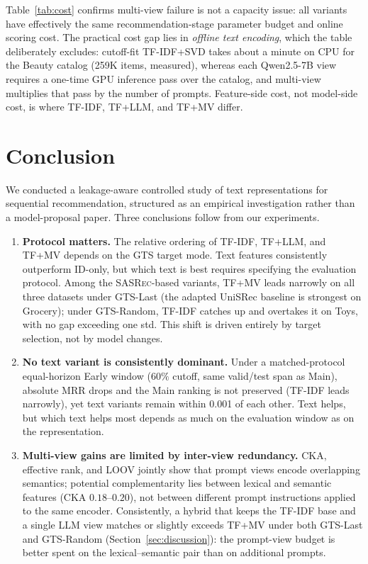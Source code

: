\documentclass[sigconf,natbib=true,anonymous]{acmart}
\newcommand{\tfidf}{\textsc{TF-IDF}\xspace}
\newcommand{\tfllm}{\textsc{TF+LLM}\xspace}
\newcommand{\tfmv}{\textsc{TF+MV}\xspace}
\newcommand{\base}{\textsc{SASRec}\xspace}
\begin{document}
Table~\ref{tab:cost} confirms multi-view failure is not a capacity issue: all variants have effectively the same recommendation-stage parameter budget and online scoring cost.
The practical cost gap lies in \emph{offline text encoding}, which the table deliberately excludes: cutoff-fit \tfidf+SVD takes about a minute on CPU for the Beauty catalog (259K items, measured), whereas each Qwen2.5-7B view requires a one-time GPU inference pass over the catalog, and multi-view multiplies that pass by the number of prompts.
Feature-side cost, not model-side cost, is where \tfidf, \tfllm, and \tfmv differ.

\section{Conclusion}
\label{sec:conclusion}

We conducted a leakage-aware controlled study of text representations for sequential recommendation, structured as an empirical investigation rather than a model-proposal paper.
Three conclusions follow from our experiments.

\begin{enumerate}[leftmargin=*,itemsep=1pt]
\item \textbf{Protocol matters.}
The relative ordering of \tfidf, \tfllm, and \tfmv depends on the GTS target mode.
Text features consistently outperform ID-only, but which text is best requires specifying the evaluation protocol.
Among the \base-based variants, \tfmv leads narrowly on all three datasets under GTS-Last (the adapted UniSRec baseline is strongest on Grocery); under GTS-Random, \tfidf catches up and overtakes it on Toys, with no gap exceeding one std. This shift is driven entirely by target selection, not by model changes.
\item \textbf{No text variant is consistently dominant.}
Under a matched-protocol equal-horizon Early window ($60\%$ cutoff, same valid/test span as Main), absolute MRR drops and the Main ranking is not preserved (\tfidf leads narrowly), yet text variants remain within 0.001 of each other.
Text helps, but which text helps most depends as much on the evaluation window as on the representation.
\item \textbf{Multi-view gains are limited by inter-view redundancy.}
CKA, effective rank, and LOOV jointly show that prompt views encode overlapping semantics; potential complementarity lies between lexical and semantic features (CKA $0.18$--$0.20$), not between different prompt instructions applied to the same encoder.
Consistently, a hybrid that keeps the \tfidf base and a single LLM view matches or slightly exceeds \tfmv under both GTS-Last and GTS-Random (Section~\ref{sec:discussion}): the prompt-view budget is better spent on the lexical--semantic pair than on additional prompts.
\end{enumerate}
\end{document}
